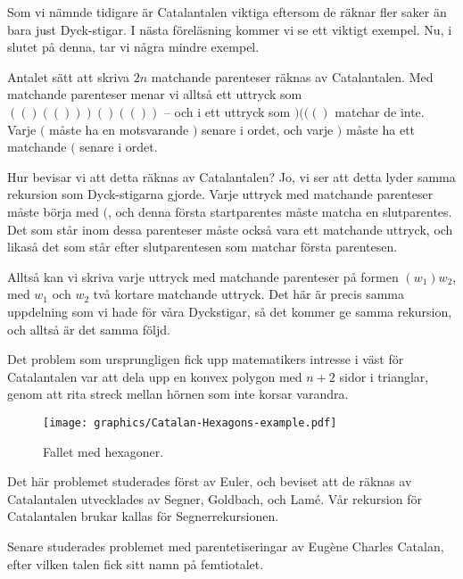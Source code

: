 \documentclass{tufte-handout}
\begin{document}
Som vi nämnde tidigare är Catalantalen viktiga eftersom de räknar fler saker än bara just Dyck-stigar. I nästa föreläsning kommer vi se ett viktigt exempel. Nu, i slutet på denna, tar vi några mindre exempel.

\begin{example}
    Antalet sätt att skriva $2n$ matchande parenteser räknas av Catalantalen. Med matchande parenteser menar vi alltså ett uttryck som $(()(()))()(())$ -- och i ett uttryck som $)((()$ matchar de inte. Varje $($ måste ha en motsvarande $)$ senare i ordet, och varje $)$ måste ha ett matchande $($ senare i ordet.

    Hur bevisar vi att detta räknas av Catalantalen? Jo, vi ser att detta lyder samma rekursion som Dyck-stigarna gjorde. Varje uttryck med matchande parenteser måste börja med $($, och denna första startparentes måste matcha en slutparentes. Det som står inom dessa parenteser måste också vara ett matchande uttryck, och likaså det som står efter slutparentesen som matchar första parentesen.

    Alltså kan vi skriva varje uttryck med matchande parenteser på formen $(w_1)w_2$, med $w_1$ och $w_2$ två kortare matchande uttryck. Det här är precis samma uppdelning som vi hade för våra Dyckstigar, så det kommer ge samma rekursion, och alltså är det samma följd.
\end{example}

\begin{example}\label{example_polygons}
    Det problem som ursprungligen fick upp matematikers intresse i väst för Catalantalen var att dela upp en konvex polygon med $n+2$ sidor i trianglar, genom att rita streck mellan hörnen som inte korsar varandra.

    \begin{figure}
        \centering
        \texttt{[image: graphics/Catalan-Hexagons-example.pdf]}
        \caption{Fallet med hexagoner.}
    \end{figure}

    Det här problemet studerades först av Euler, och beviset att de räknas av Catalantalen utvecklades av Segner, Goldbach, och Lamé. Vår rekursion för Catalantalen brukar kallas för Segnerrekursionen.

    Senare studerades problemet med parentetiseringar av Eugène Charles Catalan, efter vilken talen fick sitt namn på femtiotalet.
\end{example}
\end{document}
